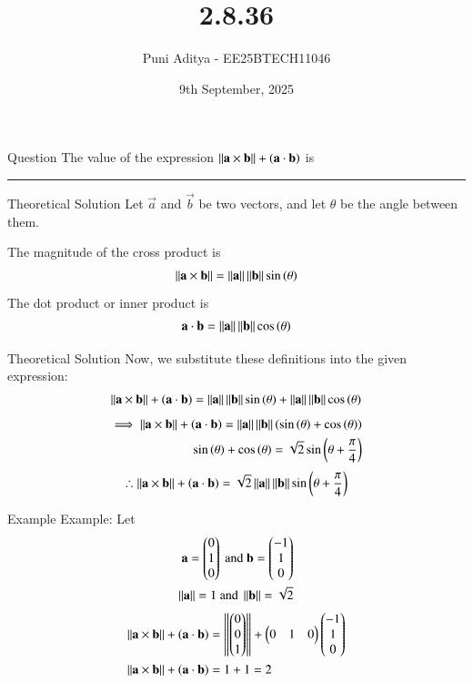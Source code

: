 \documentclass{beamer}
\title{2.8.36}
\date{9th September, 2025}
\author{Puni Aditya - EE25BTECH11046}
\begin{document}
\frame{\titlepage}
\begin{frame}{Question}
The value of the expression $\left\lVert\mathbf{a} \times \mathbf{b}\right\rVert + \left(\mathbf{a} \cdot \mathbf{b}\right)$ is \rule{2cm}{0.4pt}
\end{frame}

\begin{frame}{Theoretical Solution}
Let $\vec{a}$ and $\vec{b}$ be two vectors, and let $\theta$ be the angle between them.

The magnitude of the cross product is
\begin{align}
    \left\lVert\mathbf{a} \times \mathbf{b}\right\rVert = \left\lVert\mathbf{a}\right\rVert \left\lVert\mathbf{b}\right\rVert \sin\left(\theta\right)
\end{align}
The dot product or inner product is
\begin{align}
    \mathbf{a} \cdot \mathbf{b} = \left\lVert\mathbf{a}\right\rVert \left\lVert\mathbf{b}\right\rVert \cos\left(\theta\right)
\end{align}
\end{frame}

\begin{frame}{Theoretical Solution}
Now, we substitute these definitions into the given expression:
\begin{align}
    \left\lVert\mathbf{a} \times \mathbf{b}\right\rVert + \left(\mathbf{a} \cdot \mathbf{b}\right) = \left\lVert\mathbf{a}\right\rVert \left\lVert\mathbf{b}\right\rVert \sin\left(\theta\right) + \left\lVert\mathbf{a}\right\rVert \left\lVert\mathbf{b}\right\rVert \cos\left(\theta\right)
\end{align}
\begin{align}
\implies \left\lVert\mathbf{a} \times \mathbf{b}\right\rVert + \left(\mathbf{a} \cdot \mathbf{b}\right) = \left\lVert\mathbf{a}\right\rVert \left\lVert\mathbf{b}\right\rVert \left(\sin\left(\theta\right) + \cos\left(\theta\right)\right) \\
\sin\left(\theta\right) + \cos\left(\theta\right) = \sqrt{2}\sin\left(\theta + \frac{\pi}{4}\right)
\end{align}
\begin{align*}
\therefore \left\lVert\mathbf{a} \times \mathbf{b}\right\rVert + \left(\mathbf{a} \cdot \mathbf{b}\right) = \sqrt{2} \left\lVert\mathbf{a}\right\rVert \left\lVert\mathbf{b}\right\rVert \sin\left(\theta + \frac{\pi}{4}\right)
\end{align*}
\end{frame}

\begin{frame}{Example}
Example: Let
\begin{align*}
    \mathbf{a}=\begin{pmatrix}0 \\ 1 \\ 0\end{pmatrix}\text{ and }\mathbf{b}=\begin{pmatrix}-1 \\ 1 \\ 0\end{pmatrix} \\
    \left\lVert\mathbf{a}\right\rVert = 1\text{ and }\left\lVert\mathbf{b}\right\rVert = \sqrt{2} \\
\end{align*}
\begin{align}
    \left\lVert\mathbf{a} \times \mathbf{b}\right\rVert + \left(\mathbf{a} \cdot \mathbf{b}\right) &= \left\lVert\begin{pmatrix}0 \\ 0 \\ 1\end{pmatrix}\right\rVert + \begin{pmatrix}0 & 1 &  0\end{pmatrix} \begin{pmatrix}-1 \\ 1 \\ 0\end{pmatrix} \\
    \left\lVert\mathbf{a} \times \mathbf{b}\right\rVert + \left(\mathbf{a} \cdot \mathbf{b}\right) &= 1 + 1 = 2 \label{eq:2}
\end{align}
\end{frame}
\end{document}
